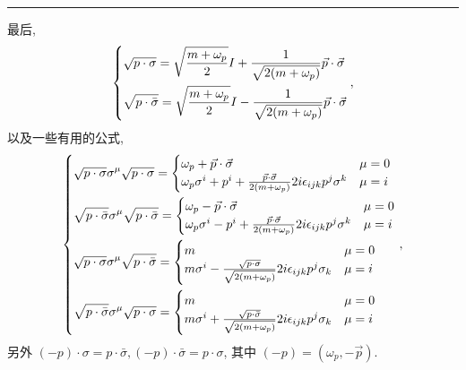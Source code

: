 \begin{itemize}
\begin{tcolorbox}[title=proof:]
		\noindent\rule[0.5ex]{\linewidth}{0.5pt} %
		
		最后,
		\begin{equation}
			\begin{dcases}
				\sqrt{p \cdot \sigma} = \sqrt{\frac{m + \omega_p}{2}} I + \frac{1}{\sqrt{2 (m + \omega_p)}} \vec{p} \cdot \vec{\sigma} \\
				\sqrt{p \cdot \bar{\sigma}} = \sqrt{\frac{m + \omega_p}{2}} I - \frac{1}{\sqrt{2 (m + \omega_p)}} \vec{p} \cdot \vec{\sigma}
			\end{dcases},
		\end{equation}
		以及一些有用的公式,
		\begin{equation}
			\begin{dcases}
				\sqrt{p \cdot \sigma} \sigma^\mu \sqrt{p \cdot \sigma} = \begin{cases}
					\omega_p + \vec{p} \cdot \vec{\sigma} & \mu = 0 \\
					\omega_p \sigma^i + p^i + \frac{\vec{p} \cdot \vec{\sigma}}{2 (m + \omega_p)} 2 i \epsilon_{i j k} p^j \sigma^k & \mu = i
				\end{cases} \\
				\sqrt{p \cdot \bar{\sigma}} \sigma^\mu \sqrt{p \cdot \bar{\sigma}} = \begin{cases}
					\omega_p - \vec{p} \cdot \vec{\sigma} & \mu = 0 \\
					\omega_p \sigma^i - p^i + \frac{\vec{p} \cdot \vec{\sigma}}{2 (m + \omega_p)} 2 i \epsilon_{i j k} p^j \sigma^k & \mu = i
				\end{cases} \\
				\sqrt{p \cdot \sigma} \sigma^\mu \sqrt{p \cdot \bar{\sigma}} = \begin{cases}
					m & \mu = 0 \\
					m \sigma^i - \frac{\sqrt{p \cdot \sigma}}{\sqrt{2 (m + \omega_p)}} 2 i \epsilon_{i j k} p^j \sigma_k & \mu = i
				\end{cases} \\
				\sqrt{p \cdot \bar{\sigma}} \sigma^\mu \sqrt{p \cdot \sigma} = \begin{cases}
					m & \mu = 0 \\
					m \sigma^i + \frac{\sqrt{p \cdot \bar{\sigma}}}{\sqrt{2 (m + \omega_p)}} 2 i \epsilon_{i j k} p^j \sigma_k & \mu = i
				\end{cases}
			\end{dcases},
		\end{equation}
		另外 $(- p) \cdot \sigma = p \cdot \bar{\sigma}, (- p) \cdot \bar{\sigma} = p \cdot \sigma$, 其中 $(- p) = (\omega_p, - \vec{p})$.
	\end{tcolorbox}
	

\end{itemize}
